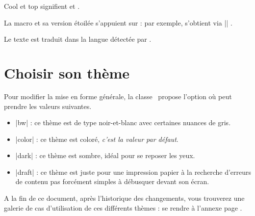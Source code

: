 \begin{tdoclatex}
Cool et top signifient  et .
\end{tdoclatex}


La macro  et sa version étoilée s'appuient sur  : par exemple,  s'obtient via \tdocinlatex|| .


\begin{tdocnote}
    Le texte  est traduit dans la langue détectée par \thisproj.
\end{tdocnote}


\section{Choisir son thème}

Pour modifier la mise en forme générale, la classe \thisproj\ propose l'option  où  peut prendre les valeurs suivantes.

\begin{itemize}
    \item \tdocinlatex|bw| :
    ce thème est de type noir-et-blanc avec certaines nuances de gris.

    \item \tdocinlatex|color| :
    ce thème est coloré, \emph{c'est la valeur par défaut}.

    \item \tdocinlatex|dark| :
    ce thème est sombre, idéal pour se reposer les yeux.

    \item \tdocinlatex|draft| :
    ce thème est juste pour une impression papier à la recherche d'erreurs de contenu pas forcément simples à débusquer devant son écran.
\end{itemize}


\begin{tdocnote}
    A la fin de ce document, après l'historique des changements, vous trouverez une galerie de cas d'utilisation de ces différents thèmes : se rendre à l'annexe page \pageref{tutodoc-theme-gallery}.
\end{tdocnote}




